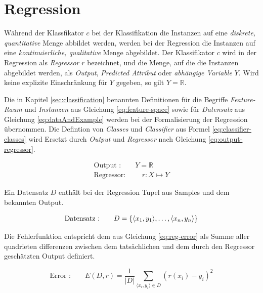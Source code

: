 \section{Regression}
\label{sec:regression}

Während der Klassfikator $c$ bei der Klassifikation die Instanzen auf eine \emph{diskrete, quantitative} Menge abbildet werden, werden bei der Regression die Instanzen auf eine \emph{kontinuierliche, qualitative} Menge abgebildet. Der Klassifikator $c$ wird in der Regression als \emph{Regressor} $r$ bezeichnet, und die Menge, auf die die Instanzen abgebildet werden, als \emph{Output}, \emph{Predicted Attribut} oder \emph{abhängige Variable} $Y$. Wird keine explizite Einschränkung für $Y$ gegeben, so gilt $Y = \mathbb{R}$. \cite[S. 24]{learning_cart_dobra} \cite[S. 8]{machine_marsland} \cite[S. 28]{statistical_learning}

Die in Kapitel \ref{sec:classification} benannten Definitionen für die Begriffe \emph{Feature-Raum} und \emph{Instanzen} aus Gleichung \ref{eq:feature-space} sowie für \emph{Datensatz} aus Gleichung \ref{eq:dataAndExample} werden bei der Formalisierung der Regression übernommen. Die Defintion von \emph{Classes} und \emph{Classifier} aus Formel \ref{eq:classifier-classes} wird Ersetzt durch \emph{Output} und \emph{Regressor} nach Gleichung \ref{eq:output-regressor}.\cite[S. 24]{learning_cart_dobra}

\begin{equation}
\label{eq:output-regressor}
\begin{gathered}
\text{Output :} \qquad Y = \mathbb{R}\\
\text{Regressor: } \qquad  r: X \mapsto Y
\end{gathered}
\end{equation}

Ein Datensatz $D$ enthält bei der Regression Tupel aus Samples und dem bekannten Output.

\begin{equation}
\text{Datensatz :} \qquad D = \{ \langle x_1, y_1 \rangle, \ldots , \langle x_n, y_n \rangle  \} \\
\end{equation}

Die Fehlerfunktion entspricht dem aus Gleichung \ref{eq:reg-error} als Summe aller quadrieten differenzen zwischen dem tatsächlichen und dem durch den Regressor geschätzten Output definiert.\cite[S. 29]{statistical_learning} \cite[S. 25]{learning_cart_dobra}

\begin{equation}
\label{eq:reg-error}
\text{Error :} \qquad E(D,r) = \frac{1}{|D|} \sum_{ \langle x_i, y_i \rangle \in D} ( r(x_i) - y_i )^2
\end{equation}

